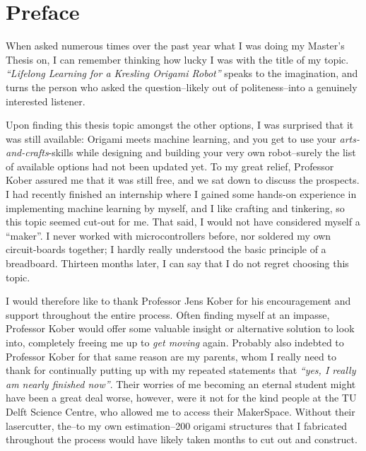 \chapter{Preface}\label{ch:preface}
When asked numerous times over the past year what I was doing my Master's Thesis on, I can remember thinking how lucky I was with the title of my topic.
\emph{``Lifelong Learning for a Kresling Origami Robot''} speaks to the imagination, and turns the person who asked the question--likely out of politeness--into a genuinely interested listener.

Upon finding this thesis topic amongst the other options, I was surprised that it was still available:
Origami meets machine learning, and you get to use your \emph{arts-and-crafts}-skills while designing and building your very own robot--surely the list of available options had not been updated yet.
To my great relief, Professor Kober assured me that it was still free, and we sat down to discuss the prospects.
I had recently finished an internship where I gained some hands-on experience in implementing machine learning by myself, and I like crafting and tinkering, so this topic seemed cut-out for me.
That said, I would not have considered myself a ``maker''.
I never worked with microcontrollers before, nor soldered my own circuit-boards together; I hardly really understood the basic principle of a breadboard.
Thirteen months later, I can say that I do not regret choosing this topic.

I would therefore like to thank Professor Jens Kober for his encouragement and support throughout the entire process.
Often finding myself at an impasse, Professor Kober would offer some valuable insight or alternative solution to look into, completely freeing me up to \emph{get moving} again.
Probably also indebted to Professor Kober for that same reason are my parents, whom I really need to thank for continually putting up with my repeated statements that \emph{``yes, I really am nearly finished now''}.
Their worries of me becoming an eternal student might have been a great deal worse, however, were it not for the kind people at the TU Delft Science Centre, who allowed me to access their MakerSpace.
Without their lasercutter, the--to my own estimation--200 origami structures that I fabricated throughout the process would have likely taken months to cut out and construct.

